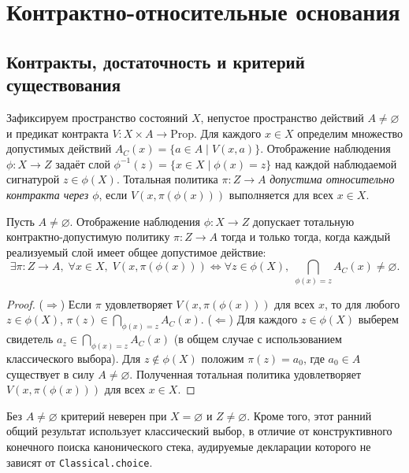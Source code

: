 \section{Контрактно-относительные основания}
\label{sec:foundations}
\subsection{Контракты, достаточность и критерий существования}
Зафиксируем пространство состояний $X$, непустое пространство действий $A \neq \varnothing$ и предикат контракта $V : X \times A \to \mathrm{Prop}$. Для каждого $x \in X$ определим множество допустимых действий $A_C(x) = \{ a \in A \mid V(x, a) \}$. Отображение наблюдения $\phi : X \to Z$ задаёт слой $\phi^{-1}(z) = \{ x \in X \mid \phi(x) = z \}$ над каждой наблюдаемой сигнатурой $z \in \phi(X)$. Тотальная политика $\pi : Z \to A$ \emph{допустима относительно контракта через $\phi$}, если $V(x, \pi(\phi(x)))$ выполняется для всех $x \in X$.

\begin{theorem}
\label{thm:sufficiency}
Пусть $A \neq \varnothing$. Отображение наблюдения $\phi : X \to Z$ допускает тотальную контрактно-допустимую политику $\pi : Z \to A$ тогда и только тогда, когда каждый реализуемый слой имеет общее допустимое действие:
\begin{equation}
\label{eq:sufficiency}
\exists \pi : Z \to A,\; \forall x \in X,\; V(x, \pi(\phi(x)))
\iff
\forall z \in \phi(X),\; \bigcap_{\phi(x) = z} A_C(x) \neq \varnothing.
\end{equation}
\end{theorem}
\begin{proof}
($\Rightarrow$) Если $\pi$ удовлетворяет $V(x, \pi(\phi(x)))$ для всех $x$, то для любого $z \in \phi(X)$, $\pi(z) \in \bigcap_{\phi(x)=z} A_C(x)$.
($\Leftarrow$) Для каждого $z \in \phi(X)$ выберем свидетель $a_z \in \bigcap_{\phi(x)=z} A_C(x)$ (в общем случае с использованием классического выбора). Для $z \notin \phi(X)$ положим $\pi(z) = a_0$, где $a_0 \in A$ существует в силу $A \neq \varnothing$. Полученная тотальная политика удовлетворяет $V(x, \pi(\phi(x)))$ для всех $x \in X$.
\end{proof}
Без $A \neq \varnothing$ критерий неверен при $X = \varnothing$ и $Z \neq \varnothing$. Кроме того, этот ранний общий результат использует классический выбор, в отличие от конструктивного конечного поиска канонического стека, аудируемые декларации которого не зависят от \texttt{Classical.choice}.

